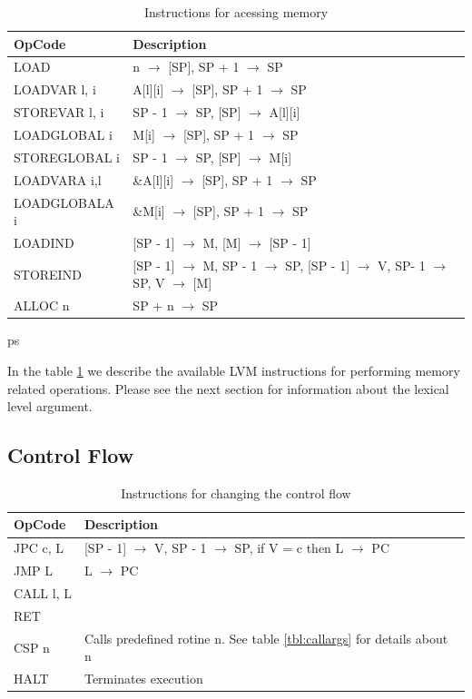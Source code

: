 \documentclass[a4paper, 11pt]{report}
\newcommand{\arrow}{\ensuremath{\rightarrow}}
\begin{document}
\begin{table}[htb]
 \begin{tabular}{|l|l|}
  \hline
  OpCode & Description\\
  \hline\hline
  LOAD & n \arrow{} [SP], SP + 1 \arrow{} SP\\ 
  LOADVAR l, i & A[l][i] \arrow{} [SP], SP + 1 \arrow{} SP\\
  STOREVAR l, i & SP - 1 \arrow{} SP, [SP] \arrow{} A[l][i]\\
  LOADGLOBAL i & M[i] \arrow{} [SP], SP + 1 \arrow{} SP\\
  STOREGLOBAL i &  SP - 1 \arrow{} SP, [SP] \arrow{} M[i]\\
  LOADVARA i,l & \&A[l][i] \arrow{} [SP], SP + 1 \arrow{} SP\\
  LOADGLOBALA i & \&M[i] \arrow{} [SP], SP + 1 \arrow{} SP\\
  LOADIND & [SP - 1] \arrow{} M, [M] \arrow{} [SP - 1]\\
  STOREIND & [SP - 1] \arrow{} M, SP - 1 \arrow{} SP, [SP - 1] \arrow{} V, SP- 1 \arrow{} SP, V \arrow{} [M]\\
  ALLOC n & SP + n \arrow{} SP\\
   \hline
 \end{tabular}
 \caption{Instructions for acessing memory}
ps \label{tbl:meminst}
\end{table}

In the table \ref{tbl:meminst} we describe the available LVM instructions for performing memory
related operations. Please see the next section for information about the lexical level argument.


\subsection{Control Flow}

\begin{table}[htb]
 \begin{tabular}{|l|l|}
  \hline
  OpCode & Description\\
  \hline\hline
  JPC c, L & [SP - 1] \arrow{} V, SP - 1 \arrow{} SP, if V = c then L \arrow{} PC\\
  JMP L & L \arrow{} PC\\
  CALL l, L & \\
  RET &\\ 
  CSP n & Calls predefined rotine n. See table \ref{tbl:callargs} for details about n\\
  HALT & Terminates execution\\
  \hline
 \end{tabular}
 \caption{Instructions for changing the control flow}
 \label{tbl:ctrlflow}
\end{table}
\end{document}
